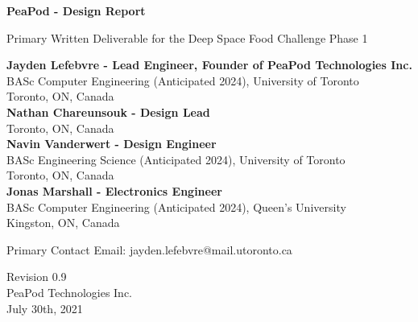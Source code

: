 \documentclass{report}
\begin{document}
\begin{titlepage}
    \begin{center}
        \vspace*{1.2cm}

        \textbf{\large{PeaPod - Design Report}}

        \vspace{0.5cm}

        Primary Written Deliverable for the Deep Space Food Challenge Phase 1

        \vfill \small{

            \textbf{Jayden Lefebvre - Lead Engineer, Founder of PeaPod Technologies Inc.}\\
            BASc Computer Engineering (Anticipated 2024), University of Toronto\\
            Toronto, ON, Canada\\
            \vspace{.5cm}
            \textbf{Nathan Chareunsouk - Design Lead}\\Toronto, ON, Canada\\
            \vspace{.5cm}
            \textbf{Navin Vanderwert - Design Engineer}\\
            BASc Engineering Science (Anticipated 2024), University of Toronto\\
            Toronto, ON, Canada\\
            \vspace{.5cm}
            \textbf{Jonas Marshall - Electronics Engineer}\\
            BASc Computer Engineering (Anticipated 2024), Queen's University\\
            Kingston, ON, Canada

        }

        \vspace{1cm}

        Primary Contact Email: jayden.lefebvre@mail.utoronto.ca

        \vspace{.75cm}

        Revision 0.9\\
        PeaPod Technologies Inc.\\
        July 30th, 2021

    \end{center}
\end{titlepage}

\thispagestyle{plain}
\end{document}
